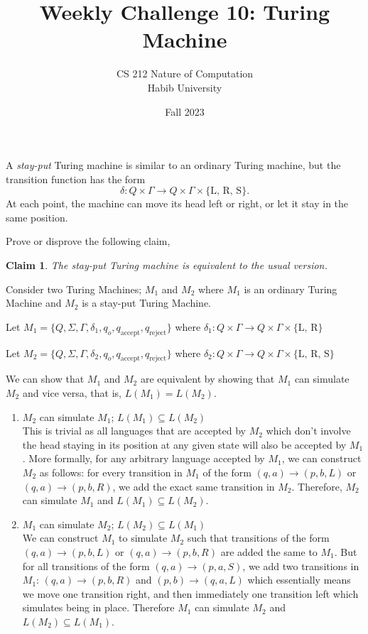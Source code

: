 \documentclass[a4paper]{exam}
\title{Weekly Challenge 10: Turing Machine}
\author{CS 212 Nature of Computation\\Habib University}
\date{Fall 2023}
\newtheorem{claim}{Claim}
\begin{document}
\maketitle

\begin{questions}


A \textit{stay-put} Turing machine is similar to an ordinary Turing machine, but the transition function has the form
\[
  \delta: Q\times \Gamma \to Q\times \Gamma \times \{\text{L, R, S} \}.
\]
At each point, the machine can move its head left or right, or let it stay in the same position.

Prove or disprove the following claim,

\begin{claim}
  The stay-put Turing machine is equivalent to the usual version.
\end{claim}

\begin{solution}

Consider two Turing Machines; $M_1$ and $M_2$ where $M_1$ is an ordinary Turing Machine and $M_2$ is a stay-put Turing Machine.

Let $M_1 = \{ Q, \Sigma, \Gamma, \delta_1, q_o, q_\text{accept}, q_\text{reject} \}$ where $ \delta_1: Q \times \Gamma \rightarrow Q \times \Gamma \times \{\text{L, R}\}$

Let $M_2 = \{ Q, \Sigma, \Gamma, \delta_2, q_o, q_\text{accept}, q_\text{reject} \}$ where $ \delta_2: Q \times \Gamma \rightarrow Q \times \Gamma \times \{\text{L, R, S}\}$

We can show that $M_1$ and $M_2$ are equivalent by showing that $M_1$ can simulate $M_2$ and vice versa, that is, $ L(M_1) = L(M_2) $. \vspace*{-1mm}
\begin{enumerate}
  \item $M_2$ can simulate $M_1$; $ L(M_1) \subseteq L(M_2) $ \\
    This is trivial as all languages that are accepted by $M_2$ which don't involve the head staying in its position at any given state will also be accepted by $M_1$. More formally, for any arbitrary language accepted by $M_1$, we can construct $M_2$ as follows: for every transition in $M_1$ of the form $ (q, a) \rightarrow (p, b, L) $ or $ (q, a) \rightarrow (p, b, R) $, we add the exact same transition in $M_2$. Therefore, $M_2$ can simulate $M_1$ and $ L(M_1) \subseteq L(M_2) $.
  \item $M_1$ can simulate $M_2$; $ L(M_2) \subseteq L(M_1) $ \\
    We can construct $M_1$ to simulate $M_2$ such that transitions of the form $ (q, a) \rightarrow (p, b, L) $ or $ (q, a) \rightarrow (p, b, R) $ are added the same to $M_1$. But for all transitions of the form $ (q, a) \rightarrow (p, a, S) $, we add two transitions in $M_1$: $ (q, a) \rightarrow (p, b, R) $ and $ (p, b) \rightarrow (q, a, L) $ which essentially means we move one transition right, and then immediately one transition left which simulates being in place. Therefore $M_1$ can simulate $M_2$ and $ L(M_2) \subseteq L(M_1) $.
\end{enumerate}


\end{solution}
\end{questions}
\end{document}
